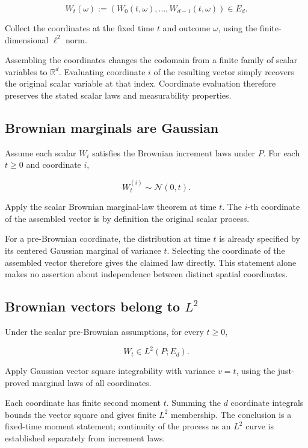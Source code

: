 \documentclass[11pt,a4paper]{article}
\begin{document}
\[W_t(\omega):=(W_0(t,\omega),\ldots,W_{d-1}(t,\omega))\in E_d.\]

Collect the coordinates at the fixed time \(t\) and outcome \(\omega\), using the finite-dimensional \(\ell^2\) norm.



Assembling the coordinates changes the codomain from a finite family of scalar variables to \(\mathbb R^d\). Evaluating coordinate \(i\) of the resulting vector simply recovers the original scalar variable at that index. Coordinate evaluation therefore preserves the stated scalar laws and measurability properties.


\subsection{\texorpdfstring{Brownian marginals are Gaussian}{Brownian marginals are Gaussian}}


Assume each scalar \(W_i\) satisfies \(\text{the Brownian increment laws}\) under \(P\). For each \(t\ge0\) and coordinate \(i\),

\[W_t^{(i)}\sim\mathcal N(0,t).\]

Apply the scalar Brownian marginal-law theorem at time \(t\). The \(i\)-th coordinate of the assembled vector is by definition the original scalar process.



For a pre-Brownian coordinate, the distribution at time \(t\) is already specified by its centered Gaussian marginal of variance \(t\). Selecting the coordinate of the assembled vector therefore gives the claimed law directly. This statement alone makes no assertion about independence between distinct spatial coordinates.


\subsection{\texorpdfstring{Brownian vectors belong to \(L^2\)}{Brownian vectors belong to L²}}


Under the scalar pre-Brownian assumptions, for every \(t\ge0\),

\[W_t\in L^2(P;E_d).\]

Apply Gaussian vector square integrability with variance \(v=t\), using the just-proved marginal laws of all coordinates.



Each coordinate has finite second moment \(t\). Summing the \(d\) coordinate integrals bounds the vector square and gives finite \(L^2\) membership. The conclusion is a fixed-time moment statement; continuity of the process as an \(L^2\) curve is established separately from increment laws.
\end{document}
